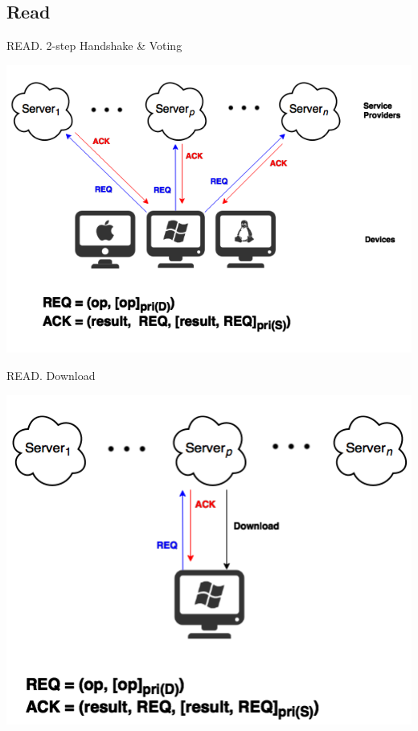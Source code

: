 \documentclass{beamer}
\newcommand{\RNum}[1]{\uppercase\expandafter{\romannumeral #1\relax}}
\begin{document}
\begin{CJK}{UTF8}{bkai}
\subsection{Read}
\begin{frame}{READ}{\RNum{1}. 2-step Handshake \& Voting}
	\begin{center}
	\includegraphics[width=.8\textwidth]{Read1.png}
	\end{center}
\end{frame}

\begin{frame}{READ}{\RNum{2}. Download}
	\begin{center}
	\includegraphics[width=.65\textwidth]{Read2.png}
	\end{center}
\end{frame}


\end{CJK}
\end{document}
